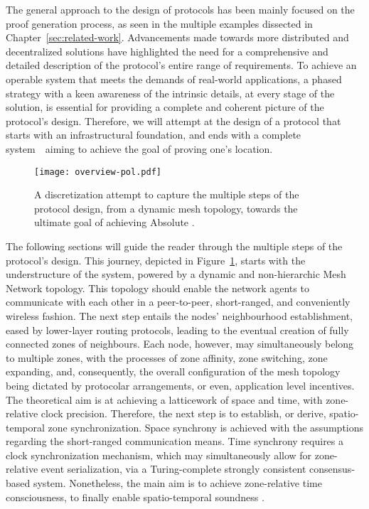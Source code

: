 The general approach to the design of \pol{} protocols has been mainly focused on the proof generation process, as seen in the multiple examples dissected in Chapter~\ref{sec:related-work}. Advancements made towards more distributed and decentralized solutions have highlighted the need for a comprehensive and detailed description of the protocol's entire range of requirements. To achieve an operable system that meets the demands of real-world applications, a phased strategy with a keen awareness of the intrinsic details, at every stage of the solution, is essential for providing a complete and coherent picture of the protocol's design. Therefore, we will attempt at the design of a \pol{} protocol that starts with an infrastructural foundation, and ends with a complete system~\textemdash~aiming to achieve the goal of proving one's location.

\begin{figure}[ht]
    \begin{center}
    \texttt{[image: overview-pol.pdf]}
    \caption{A discretization attempt to capture the multiple steps of the protocol design, from a dynamic mesh topology, towards the ultimate goal of achieving Absolute \pol.}
    \label{fig:proof-of-location-overview}
    \end{center}
\end{figure}

The following sections will guide the reader through the multiple steps of the protocol's design. This journey, depicted in Figure~\ref{fig:proof-of-location-overview}, starts with the understructure of the system, powered by a dynamic and non-hierarchic Mesh Network topology. This topology should enable the network agents to communicate with each other in a peer-to-peer, short-ranged, and conveniently wireless fashion. The next step entails the nodes' neighbourhood establishment, eased by lower-layer routing protocols, leading to the eventual creation of fully connected zones of neighbours. Each node, however, may simultaneously belong to multiple zones, with the processes of zone affinity, zone switching, zone expanding, and, consequently, the overall configuration of the mesh topology being dictated by protocolar arrangements, or even, application level incentives. The theoretical aim is at achieving a latticework of space and time, with zone-relative clock precision. Therefore, the next step is to establish, or derive, spatio-temporal zone synchronization. Space synchrony is achieved with the assumptions regarding the short-ranged communication means. Time synchrony requires a clock synchronization mechanism, which may simultaneously allow for zone-relative event serialization, via a Turing-complete strongly consistent consensus-based system. Nonetheless, the main aim is to achieve zone-relative time consciousness, to finally enable spatio-temporal soundness \cite{nasrulin2018robust}.

